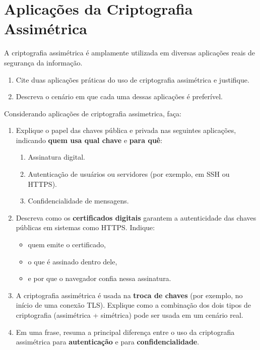 \section{Aplicações da Criptografia Assimétrica}

A criptografia assimétrica é amplamente utilizada em diversas aplicações reais de segurança da informação.


\begin{enumerate}
    \item Cite duas aplicações práticas do uso de criptografia assimétrica e justifique.
    \item Descreva o cenário em que cada uma dessas aplicações é preferível.
\end{enumerate}

Considerando aplicações de criptografia assimetrica, faça:

\begin{enumerate}

    \item  Explique o papel das chaves pública e privada nas seguintes aplicações, indicando \textbf{quem usa qual chave} e \textbf{para quê}:
          \begin{enumerate}
              \item Assinatura digital.
              \item Autenticação de usuários ou servidores (por exemplo, em SSH ou HTTPS).
              \item Confidencialidade de mensagens.
          \end{enumerate}

    \item  Descreva como os \textbf{certificados digitais} garantem a autenticidade das chaves públicas em sistemas como HTTPS. Indique:
          \begin{itemize}
              \item quem emite o certificado,
              \item o que é assinado dentro dele,
              \item e por que o navegador confia nessa assinatura.
          \end{itemize}

    \item  A criptografia assimétrica é usada na \textbf{troca de chaves} (por exemplo, no início de uma conexão TLS).
          Explique como a combinação dos dois tipos de criptografia (assimétrica + simétrica) pode ser usada em um cenário real.

    \item  Em uma frase, resuma a principal diferença entre o uso da criptografia assimétrica para \textbf{autenticação} e para \textbf{confidencialidade}.

\end{enumerate}


